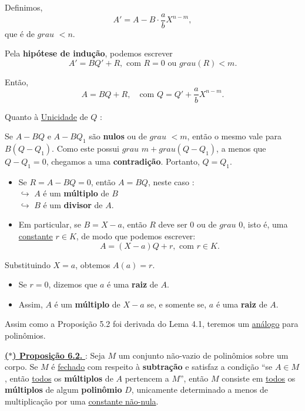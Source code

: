         Definimos, 
        \[
        A' = A - B \cdot \frac{a}{b} X^{n-m},
        \]
        que é de $grau$ $< n$.  

        Pela \textbf{hipótese de indução}, podemos escrever
        \[
        A' = BQ' + R, \text{ com $R = 0$ ou $grau(R) < m$}.
        \]

        Então,
        \[
        A = BQ + R, \quad \text{com } Q = Q' + \frac{a}{b} X^{n-m}.
        \]

        Quanto à \underline{Unicidade} de $Q$ : 

        Se $A - BQ$ e $A - BQ_1$ são \textbf{nulos} ou de $grau$ $< m$, então o mesmo vale para $B(Q - Q_1)$.  
        Como este possui $grau$ $m + grau(Q - Q_1)$, a menos que $Q - Q_1 = 0$, chegamos a uma \textbf{contradição}.  
        Portanto, $Q = Q_1$.  
    
    \begin{itemize}[left=0.5cm, align=left, nosep]
        \item Se $R = A - BQ = 0$, então $A = BQ$, neste caso : \\ 
        $\hookrightarrow$ $A$ é um \textbf{múltiplo} de $B$ \\
        $\hookrightarrow$ $B$ é um \textbf{divisor} de $A$. 

        \item Em particular, se $B = X - a$, então $R$ deve ser $0$ ou de $grau$ $0$, isto é, uma \underline{constante} $r \in K$, de modo que podemos escrever:
            \[
            A = (X - a)Q + r, \text{ com } r \in K.
            \]
    
    \end{itemize}

    Substituindo $X = a$, obtemos $\boxed{A(a) = r}$.  

    \begin{itemize}[left=0.5cm, align=left, nosep]
        \item Se $r = 0$, dizemos que $a$ é uma \textbf{raiz} de $A$.
        \item Assim, $A$ é um \textbf{múltiplo} de $X - a$ se, e somente se, $a$ é uma \textbf{raiz} de $A$.  
    \end{itemize}

    Assim como a Proposição 5.2 foi derivada do Lema 4.1, teremos um \underline{análogo} para polinômios.

    \underline{\underline{ \textbf{\textcolor{cinzaEscuro}{($\ast$) Proposição 6.2.}} }} : Seja $M$ um conjunto não-vazio de polinômios sobre um corpo. 
    Se $M$ é \underline{fechado} com respeito à \textbf{subtração} e satisfaz a condição “se $A \in M$, então \underline{todos} 
    os \textbf{múltiplos} de $A$ pertencem a $M$”, então $M$ consiste em \underline{todos} os \textbf{múltiplos} de algum \textbf{polinômio} $D$, unicamente determinado a menos de
    multiplicação por uma \underline{constante não-nula}.

